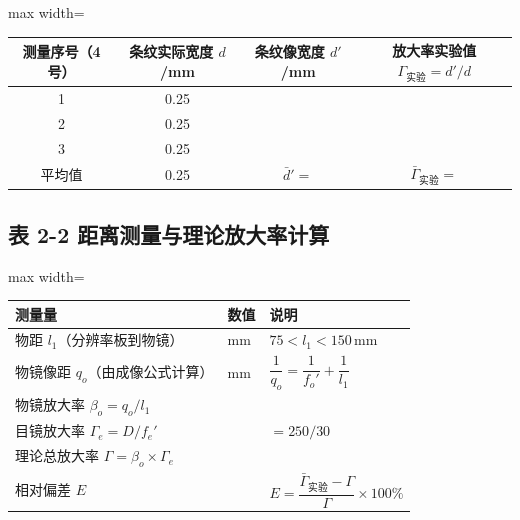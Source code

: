 \documentclass[12pt, a4paper]{article}
\begin{document}
\begin{table}[H]
  \centering
  \begin{adjustbox}{max width=\textwidth}
    \begin{tabular}{cccc}
      \toprule
      测量序号（4 号） & 条纹实际宽度 $d$/mm & 条纹像宽度 $d'$/mm & 放大率实验值 $\Gamma_{\text{实验}} = d'/d$ \\
      \midrule
      1 & 0.25 & & \\[0.4cm]
      2 & 0.25 & & \\[0.4cm]
      3 & 0.25 & & \\[0.4cm]
      \midrule
      平均值 & 0.25 & $\bar{d}' = $ & $\bar{\Gamma}_{\text{实验}} = $ \\
      \bottomrule
    \end{tabular}
  \end{adjustbox}
\end{table}

\vspace{0.3cm}

\subsection*{表 2-2 \quad 距离测量与理论放大率计算}

\begin{table}[H]
  \centering
  \begin{adjustbox}{max width=\textwidth}
    \begin{tabular}{p{7cm}p{3cm}p{4cm}}
      \toprule
      测量量 & 数值 & 说明 \\
      \midrule
      物距 $l_1$（分辨率板到物镜）& \hspace{1.5cm} mm & $75 < l_1 < 150\,\text{mm}$ \\[0.4cm]
      物镜像距 $q_o$（由成像公式计算）& \hspace{1.5cm} mm & $\dfrac{1}{q_o} = \dfrac{1}{f_o'} + \dfrac{1}{l_1}$ \\[0.6cm]
      物镜放大率 $\beta_o = q_o / l_1$ & & \\[0.4cm]
      目镜放大率 $\Gamma_e = D/f_e'$ & & $= 250/30$ \\[0.4cm]
      \midrule
      理论总放大率 $\Gamma = \beta_o \times \Gamma_e$ & & \\[0.4cm]
      相对偏差 $E$ & & $E = \dfrac{\bar{\Gamma}_{\text{实验}} - \Gamma}{\Gamma} \times 100\%$ \\[0.6cm]
      \bottomrule
    \end{tabular}
  \end{adjustbox}
\end{table}

\vspace{3cm}
\end{document}
